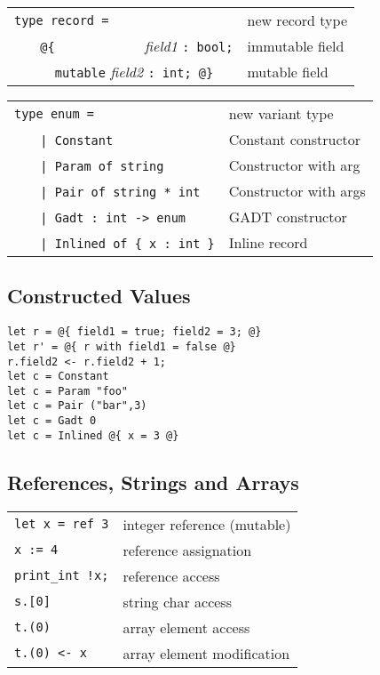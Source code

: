\documentclass[10pt,landscape]{article}
\begin{document}
\begin{multicols}{3}
\begin{tabular}{ll}
\Verb!type record =! & new record type \\
~~~ \Verb!@{!~~~~~~~~~~~~ \emph{field1} \Verb!: bool;! & immutable field \\
~~~ \Verb!  mutable! \emph{field2} \Verb!: int; @}! & mutable field \\
\end{tabular}
\begin{tabular}{ll}
\Verb!type enum =! & new variant type \\
~~~ \Verb!| Constant! & Constant constructor \\
~~~ \Verb!| Param of string! & Constructor with arg \\
~~~ \Verb!| Pair of string * int! & Constructor with args \\
~~~ \Verb!| Gadt : int -> enum! & GADT constructor \\
~~~ \Verb!| Inlined of { x : int }! & Inline record \\
\end{tabular}

\subsection{Constructed Values}

\begin{Verbatim}
let r = @{ field1 = true; field2 = 3; @}
let r' = @{ r with field1 = false @}
r.field2 <- r.field2 + 1;
let c = Constant
let c = Param "foo"
let c = Pair ("bar",3)
let c = Gadt 0
let c = Inlined @{ x = 3 @}
\end{Verbatim}

\subsection{References, Strings and Arrays}

\begin{tabular}{ll}
\Verb!let x = ref 3! & integer reference (mutable) \\
\Verb!x := 4! & reference assignation \\
\verb&print_int !x;& & reference access \\
\Verb!s.[0]! & string char access \\
\Verb!t.(0)! & array element access \\
\Verb!t.(0) <- x! & array element modification \\
\end{tabular}


\end{multicols}
\end{document}
